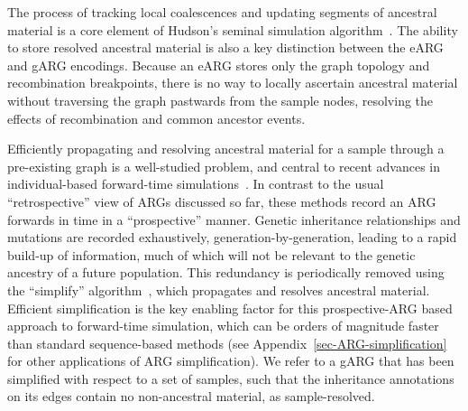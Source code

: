 \documentclass[9pt,twocolumn,twoside]{gsajnl}
\begin{document}
The process of tracking local coalescences and updating
segments of ancestral material is a core element of
Hudson's seminal simulation
algorithm~\citep{hudson1983testing,kelleher2016efficient}.
The ability to store resolved ancestral material
is also a key distinction between the eARG and gARG
encodings. Because an eARG stores only the graph topology and
recombination breakpoints, there is no way to locally
ascertain ancestral material without traversing the graph
pastwards from the sample nodes,
resolving the effects of recombination and common ancestor events.

Efficiently propagating and resolving ancestral material for
a sample through a pre-existing graph is a well-studied problem,
and central to recent advances in individual-based forward-time
simulations~\citep{kelleher2018efficient,haller2018tree}.
In contrast to the usual ``retrospective'' view of ARGs
discussed so far, these methods record an ARG forwards in
time in a ``prospective'' manner. Genetic inheritance relationships
and mutations are recorded exhaustively, generation-by-generation,
leading to a rapid build-up of information, much of which
will not be relevant to the genetic ancestry of a future population.
This redundancy is periodically removed using the ``simplify''
algorithm~\citep{kelleher2018efficient}, which propagates and
resolves ancestral material.
Efficient simplification is the key enabling factor for
this prospective-ARG based approach to forward-time simulation,
which can be orders of magnitude faster than standard
sequence-based methods
(see Appendix~\ref{sec-ARG-simplification} for
other applications of ARG simplification).
We refer to a gARG that has been simplified with respect to a set of
samples, such that the inheritance annotations on its edges contain
no non-ancestral material,  as sample-resolved.
\end{document}
